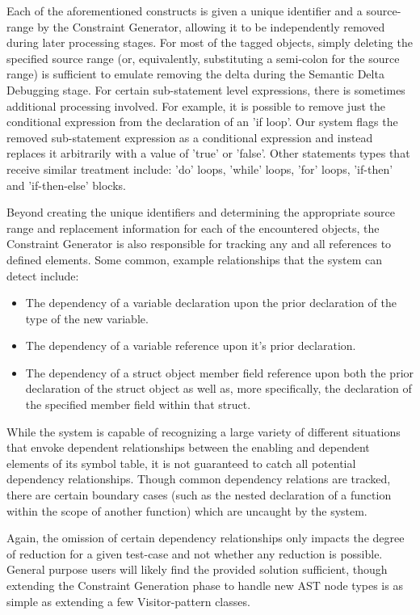 \documentclass[preprint]{acm_proc_article-sp}
\begin{document}
Each of the aforementioned constructs is given a unique identifier and a source-
range by the Constraint Generator, allowing it to be independently removed
during later processing stages. For most of the tagged objects, simply deleting
the specified source range (or, equivalently, substituting a semi-colon for the
source range) is sufficient to emulate removing the delta during the Semantic
Delta Debugging stage. For certain sub-statement level expressions, there is
sometimes additional processing involved. For example, it is possible to remove
just the conditional expression from the declaration of an 'if loop'. Our
system flags the removed sub-statement expression as a conditional expression
and instead replaces it arbitrarily with a value of 'true' or 'false'. Other
statements types that receive similar treatment include: 'do' loops, 'while'
loops, 'for' loops, 'if-then' and 'if-then-else' blocks.

Beyond creating the unique identifiers and determining the appropriate source
range and replacement information for each of the encountered objects, the
Constraint Generator is also responsible for tracking any and all references to
defined elements. Some common, example relationships that the system can detect
include:

\begin{itemize}

\item The dependency of a variable declaration upon the prior declaration of the
      type of the new variable.
\item The dependency of a variable reference upon it's prior declaration.
\item The dependency of a struct object member field reference upon both the
      prior declaration of the struct object as well as, more specifically, the
      declaration of the specified member field within that struct.

\end{itemize}

While the system is capable of recognizing a large variety of different
situations that envoke dependent relationships between the enabling and
dependent elements of its symbol table, it is not guaranteed to catch all
potential dependency relationships. Though common dependency relations are
tracked, there are certain boundary cases (such as the nested declaration of a
function within the scope of another function) which are uncaught by the system.

Again, the omission of certain dependency relationships only impacts the degree
of reduction for a given test-case and not whether any reduction is possible.
General purpose users will likely find the provided solution sufficient, though
extending the Constraint Generation phase to handle new AST node types is as
simple as extending a few Visitor-pattern classes.
\end{document}
